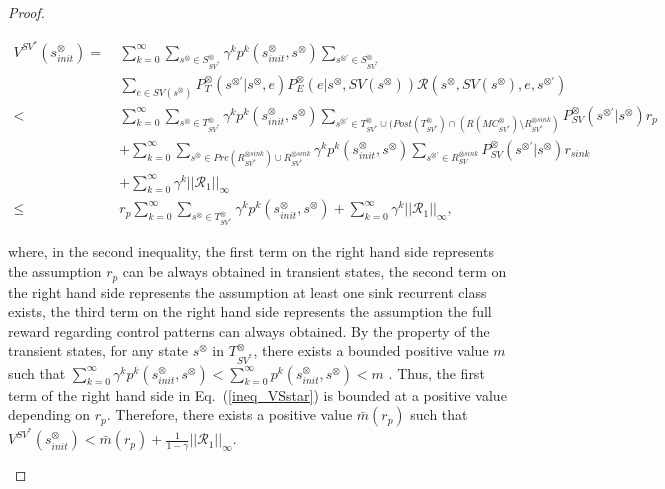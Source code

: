 \documentclass[10pt]{article}
\theoremstyle{definition}
\begin{document}
\begin{proof}
\begin{enumerate}
  \begin{align}
    V^{SV^{\ast}}\!(s^{\otimes}_{init})
    =\ & \sum_{k=0}^{\infty} \sum_{s^{\otimes} \in S^{\otimes}_{SV^{\ast}}} \gamma^k p^k(s^{\otimes}_{init}, s^{\otimes}) \sum_{s^{\otimes \prime} \in S^{\otimes}_{SV^{\ast}}} \nonumber \\
     & \sum_{e \in SV(s^{\otimes})} P^{\otimes}_T (s^{\otimes \prime} | s^{\otimes}, e) P^{\otimes}_E (e | s^{\otimes}, SV(s^{\otimes})) \mathcal{R}(s^{\otimes}, SV(s^{\otimes}), e, s^{\otimes \prime})  \nonumber \\
     <\ & \sum_{k=0}^{\infty} \sum_{s^{\otimes} \in T^{\otimes}_{SV^{\ast}}} \gamma^k p^k(s^{\otimes}_{init}, s^{\otimes}) \sum_{s^{\otimes \prime} \in T^{\otimes}_{SV^{\ast}} \cup ( Post(T^{\otimes}_{SV^{\ast}}) \cap (R(MC^{\otimes}_{SV^{\ast}}) \setminus R^{\otimes sink}_{SV^{\ast}})} P^{\otimes}_{SV} (s^{\otimes \prime} | s^{\otimes}) r_p \nonumber \\
     & + \sum_{k=0}^{\infty} \sum_{s^{\otimes} \in Pre(R^{\otimes sink}_{SV^{\ast}}) \cup R^{\otimes sink}_{SV^{\ast}}} \gamma^k p^k(s^{\otimes}_{init}, s^{\otimes}) \sum_{s^{\otimes \prime} \in R^{\otimes sink}_{SV}} P^{\otimes}_{SV}(s^{\otimes \prime}|s^{\otimes}) r_{sink}  \nonumber \\
     & + \sum_{k=0}^{\infty} \gamma^k ||\mathcal{R}_1||_{\infty} \nonumber \\
     \leq\ & r_p \sum_{k=0}^{\infty} \sum_{s^{\otimes} \in T^{\otimes}_{SV^{\ast}}} \gamma^k p^k(s^{\otimes}_{init}, s^{\otimes}) + \sum_{k=0}^{\infty} \gamma^k ||\mathcal{R}_1||_{\infty},
  \label{ineq_VSstar}
  \end{align}

  where, in the second inequality, the first term on the right hand side represents the assumption $r_p$ can be always obtained in transient states, the second term on the right hand side represents the assumption at least one sink recurrent class exists, the third term on the right hand side represents the assumption the full reward regarding control patterns can always obtained.
  By the property of the transient states, for any state $s^{\otimes}$ in $T^{\otimes}_{SV^{\ast}}$, there exists a bounded positive value $m$ such that $ \sum_{k=0}^{\infty} \gamma^k p^k(s^{\otimes}_{init}, s^{\otimes}) < \sum_{k=0}^{\infty} p^k(s^{\otimes}_{init}, s^{\otimes}) < m$ \cite{ESS}. Thus, the first term of the right hand side in Eq.\ (\ref{ineq_VSstar}) is bounded at a positive value depending on $r_p$. Therefore, there exists a positive value $\bar{m}(r_p)$ such that $V^{SV^{\ast}}(s^{\otimes}_{init}) < \bar{m}(r_p) + \frac{1}{1-\gamma} ||\mathcal{R}_1||_{\infty}$.


\end{enumerate}
\end{proof}
\end{document}
